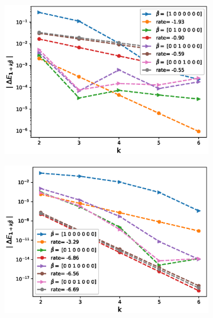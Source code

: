 \documentclass[11pt]{article}
\begin{document}
\FloatBarrier
\begin{figure}[htb]
	\centering %
	\begin{subfigure}{0.33\textwidth}
		\includegraphics[width=\linewidth]{./figures/Heston_single_call_full_truncation_vol/mixed_rates/set3/N_4/first_difference_heston_4steps_hierarchical}
		\caption{}
		\label{fig:1}
	\end{subfigure}\hfil %
	\begin{subfigure}{0.33\textwidth}
		\includegraphics[width=\linewidth]{./figures/Heston_single_call_ABR_moment_matching/mixed_rates/set3/N_4/first_difference_heston_4steps_hierarchical}
		\caption{}
		\label{fig:2}
	\end{subfigure}\hfil %
	\begin{subfigure}{0.33\textwidth}

\end{subfigure}
\end{figure}
\end{document}
